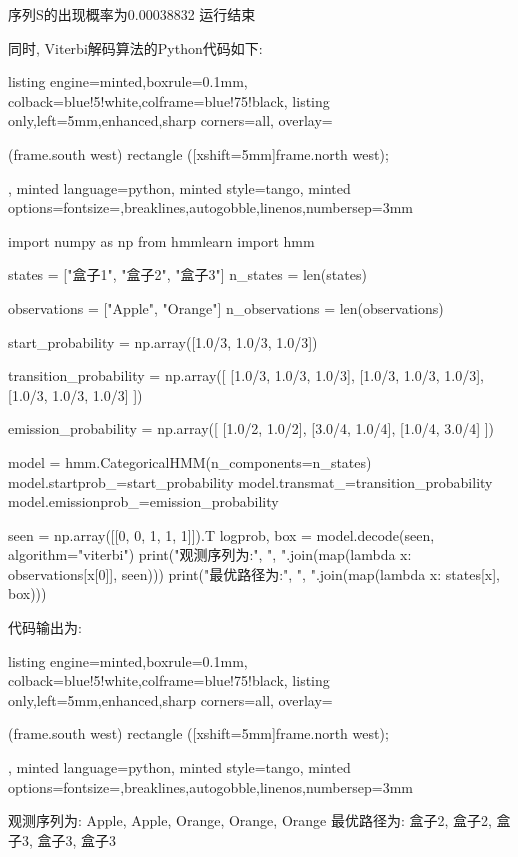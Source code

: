 \documentclass{article}
\begin{document}
\begin{homeworkProblem}
\begin{tcblisting}
序列S的出现概率为0.00038832
运行结束
\end{tcblisting}
同时, Viterbi解码算法的Python代码如下:
\begin{tcblisting}{listing engine=minted,boxrule=0.1mm,
colback=blue!5!white,colframe=blue!75!black,
listing only,left=5mm,enhanced,sharp corners=all,
overlay={\begin{tcbclipinterior} (frame.south west)
rectangle ([xshift=5mm]frame.north west);\end{tcbclipinterior}},
minted language=python,
minted style=tango,
minted options={fontsize=\small,breaklines,autogobble,linenos,numbersep=3mm}}
import numpy as np
from hmmlearn import hmm

states = ["盒子1", "盒子2", "盒子3"]
n_states = len(states)

observations = ["Apple", "Orange"]
n_observations = len(observations)

start_probability = np.array([1.0/3, 1.0/3, 1.0/3])

transition_probability = np.array([
    [1.0/3, 1.0/3, 1.0/3],
    [1.0/3, 1.0/3, 1.0/3],
    [1.0/3, 1.0/3, 1.0/3]
])

emission_probability = np.array([
    [1.0/2, 1.0/2],
    [3.0/4, 1.0/4],
    [1.0/4, 3.0/4]
])

model = hmm.CategoricalHMM(n_components=n_states)
model.startprob_=start_probability
model.transmat_=transition_probability
model.emissionprob_=emission_probability

seen = np.array([[0, 0, 1, 1, 1]]).T
logprob, box = model.decode(seen, algorithm="viterbi")
print("观测序列为:", ", ".join(map(lambda x: observations[x[0]], seen)))
print("最优路径为:", ", ".join(map(lambda x: states[x], box)))
\end{tcblisting}
代码输出为:
\begin{tcblisting}{listing engine=minted,boxrule=0.1mm,
colback=blue!5!white,colframe=blue!75!black,
listing only,left=5mm,enhanced,sharp corners=all,
overlay={\begin{tcbclipinterior} (frame.south west)
rectangle ([xshift=5mm]frame.north west);\end{tcbclipinterior}},
minted language=python,
minted style=tango,
minted options={fontsize=\small,breaklines,autogobble,linenos,numbersep=3mm}}
观测序列为: Apple, Apple, Orange, Orange, Orange
最优路径为: 盒子2, 盒子2, 盒子3, 盒子3, 盒子3
\end{tcblisting}
\end{homeworkProblem}


%
\end{document}
